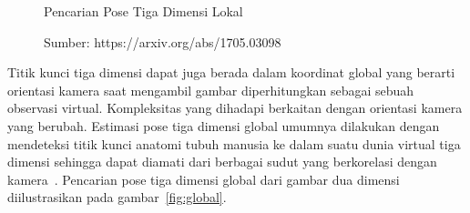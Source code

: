 \begin{figure}[htbp]
    \begin{center}
    \end{center}
    \vspace{-20pt}
    \captionsetup{labelfont=bf, textfont=bf}
    \caption{Pencarian Pose Tiga Dimensi Lokal}
    \vspace{-10pt}
    \captionsetup{labelfont=md, textfont=md}
    \caption*{Sumber: https://arxiv.org/abs/1705.03098}
    \label{fig:lokal}
\end{figure}

Titik kunci tiga dimensi dapat juga berada dalam koordinat global yang berarti orientasi kamera
saat mengambil gambar diperhitungkan sebagai sebuah observasi virtual. Kompleksitas yang dihadapi
berkaitan dengan orientasi kamera yang berubah. Estimasi pose tiga dimensi global umumnya dilakukan
dengan mendeteksi titik kunci anatomi tubuh manusia ke dalam suatu dunia virtual tiga dimensi sehingga
dapat diamati dari berbagai sudut yang berkorelasi dengan kamera~\cite{2017arXiv170402447Z, 2019arXiv190700837M}.
Pencarian pose tiga dimensi global dari gambar dua dimensi diilustrasikan pada gambar~\ref{fig:global}.

